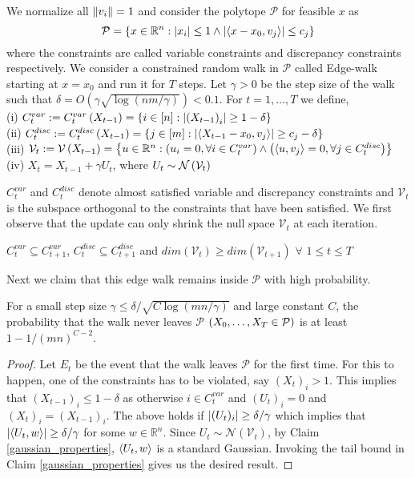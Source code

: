 We normalize all $\left\lVert v_i \right\rVert=1$ and consider the polytope $\mathcal{P}$ for feasible $x$ as
\[ \mathcal{P} = \left\{x\in \mathbb{R}^n : \left\lvert x_i \right\rvert \leq 1 \wedge \left\lvert \left\langle x-x_0,v_j\right\rangle \right\rvert \leq c_j \right\}\]
where the constraints are called variable constraints and discrepancy constraints respectively.
We consider a constrained random walk in $\mathcal{P}$ called Edge-walk starting at $x=x_0$ and run it for $T$ steps. Let $\gamma >0$ be the step size of the walk such that $\delta = O(\gamma \sqrt{\log(nm/\gamma)}) < 0.1$. For $t= 1,\hdots,T$ we define,\\
(i) $C_t^{var} := C_t^{var}\left(X_{t-1} \right ) = \left\{ i \in [n] : \left\lvert \left(X_{t-1} \right )_i \right\rvert \geq 1- \delta\right\}$ \\
(ii) $C_t^{disc} := C_t^{disc}\left(X_{t-1} \right ) = \left\{j \in [m] : \left\lvert \left\langle X_{t-1}-x_0,v_j\right\rangle \right\rvert \geq c_j - \delta\right\}$ \\
(iii) $\mathcal{V}_t := \mathcal{V}\left(X_{t-1} \right ) = \left\{u \in \mathbb{R}^n : \left(u_i = 0, \forall i \in C_t^{var} \right ) \wedge \left(\left\langle u,v_j\right\rangle=0, \forall j \in C_t^{disc} \right ) \right\}$  \\
(iv) $X_t = X_{t-1} + \gamma U_t$, where $U_t \sim \mathcal{N}\left(\mathcal{V}_t \right )$

$C_t^{var}$ and $C_t^{disc}$ denote almost satisfied variable and discrepancy constraints and $\mathcal{V}_t$ is the subspace orthogonal to the constraints that have been satisfied.
We first observe that the update can only shrink the null space $\mathcal{V}_t$ at each iteration.
\begin{Claim}
$C_t^{var} \subseteq C_{t+1}^{var}$, $C_t^{disc} \subseteq C_{t+1}^{disc}$ and $dim(\mathcal{V}_t) \geq dim(\mathcal{V}_{t+1})$ $\forall$ $1 \leq t \leq T$
\end{Claim}

Next we claim that this edge walk remains inside $\mathcal{P}$ with high probability.
\begin{Claim}
For a small step size $\gamma \leq \delta/\sqrt{C\log(mn/\gamma)}$ and large constant $C$, the probability that the walk never leaves $\mathcal{P}$ $\left(X_0,\hdots,X_T \in \mathcal{P} \right )$ is at least $1 - 1/(mn)^{C-2}$.
\end{Claim}
\begin{proof}
Let $E_t$ be the event that the walk leaves $\mathcal{P}$ for the first time.
For this to happen, one of the constraints has to be violated, say $(X_t)_i>1$.
This implies that $(X_{t-1})_i \leq 1 - \delta$ as otherwise $i \in C_t^{var}$ and $(U_t)_i=0$ and $(X_{t})_i=(X_{t-1})_i$.
The above holds if $\left\lvert (U_t)_i \right\rvert \geq \delta/\gamma$ which implies that $\left\lvert \left\langle U_t,w\right\rangle \right\rvert \geq \delta/\gamma$ for some $w \in \mathbb{R}^n$.
Since $U_t \sim \mathcal{N}(\mathcal{V}_t)$, by Claim \ref{gaussian_properties}, $\left\langle U_t,w\right\rangle$ is a standard Gaussian. Invoking the tail bound in Claim \ref{gaussian_properties} gives us the desired result.
\end{proof}

